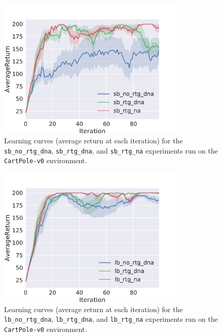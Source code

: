 \begin{figure}[h]
  \centering
  \includegraphics[width=0.8\textwidth]{cartpole_small.pdf}
  \caption{%
    Learning curves (average return at each iteration) for
    the \texttt{sb\_no\_rtg\_dna}, \texttt{sb\_rtg\_dna}, and
    \texttt{sb\_rtg\_na} experiments run on the \texttt{CartPole-v0}
    environment.
  }
  \label{fig:small-cartpole}
\end{figure}

\begin{figure}[h]
  \centering
  \includegraphics[width=0.8\textwidth]{cartpole_large.pdf}
  \caption{%
    Learning curves (average return at each iteration) for
    the \texttt{lb\_no\_rtg\_dna}, \texttt{lb\_rtg\_dna}, and
    \texttt{lb\_rtg\_na} experiments run on the \texttt{CartPole-v0}
    environment.
  }
  \label{fig:large-cartpole}
\end{figure}

